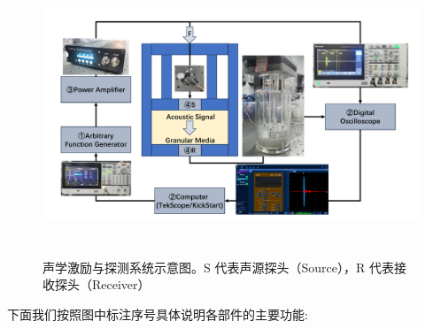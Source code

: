 \begin{figure}[!htp]
  \centering
  \includegraphics[height=8.5cm]{figures/2_apparatus.pdf}
  \caption{声学激励与探测系统示意图。S 代表声源探头（Source），R 代表接收探头（Receiver）}
  \label{fig:apparatus}
\end{figure}

下面我们按照图中标注序号具体说明各部件的主要功能:

